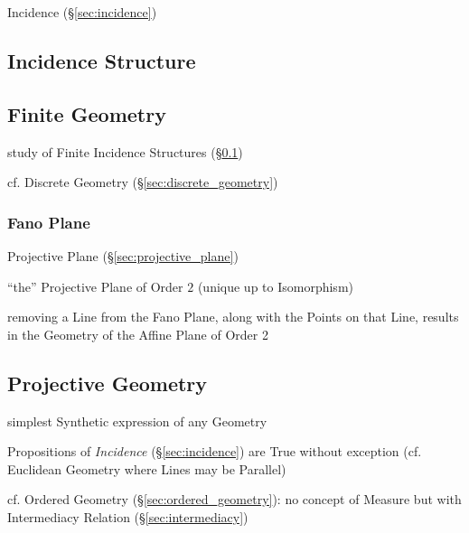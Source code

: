 Incidence (\S\ref{sec:incidence})



\subsection{Incidence Structure}\label{sec:incidence_structure}

\subsection{Finite Geometry}\label{sec:finite_geometry}

study of Finite Incidence Structures (\S\ref{sec:incidence_structure})

cf. Discrete Geometry (\S\ref{sec:discrete_geometry})



\subsubsection{Fano Plane}\label{sec:fano_plane}

Projective Plane (\S\ref{sec:projective_plane})

``the'' Projective Plane of Order $2$ (unique up to Isomorphism)

removing a Line from the Fano Plane, along with the Points on that Line, results
in the Geometry of the Affine Plane of Order 2



\subsection{Projective Geometry}\label{sec:projective_geometry}

simplest Synthetic expression of any Geometry

Propositions of \emph{Incidence} (\S\ref{sec:incidence}) are True without
exception (cf. Euclidean Geometry where Lines may be Parallel)

\fist cf. Ordered Geometry (\S\ref{sec:ordered_geometry}): no concept of Measure
but with Intermediacy Relation (\S\ref{sec:intermediacy})

